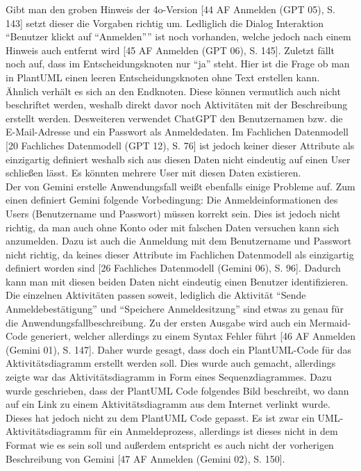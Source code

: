 Gibt man den groben Hinweis der 4o-Version [44 AF Anmelden (GPT 05), S. 143] setzt dieser die Vorgaben richtig um. Ledliglich die Dialog Interaktion ``Benutzer klickt auf ``Anmelden''''
ist noch vorhanden, welche jedoch nach einem Hinweis auch entfernt wird [45 AF Anmelden (GPT 06), S. 145]. Zuletzt fällt noch auf, dass
im Entscheidungsknoten nur ``ja'' steht. Hier ist die Frage ob man in PlantUML einen leeren Entscheidungsknoten ohne Text erstellen kann. Ähnlich 
verhält es sich an den Endknoten. Diese können vermutlich auch nicht beschriftet werden, weshalb direkt davor noch Aktivitäten mit der Beschreibung erstellt
werden. Desweiteren verwendet ChatGPT den Benutzernamen bzw. die E-Mail-Adresse und ein Passwort als Anmeldedaten. Im Fachlichen Datenmodell 
[20 Fachliches Datenmodell (GPT 12), S. 76] ist jedoch keiner dieser Attribute als einzigartig definiert weshalb sich aus diesen Daten nicht eindeutig 
auf einen User schließen lässt. Es könnten mehrere User mit diesen Daten existieren.\\

Der von Gemini erstelle Anwendungsfall weißt ebenfalls einige Probleme auf. Zum einen definiert Gemini folgende Vorbedingung: Die Anmeldeinformationen des 
Users (Benutzername und Passwort) müssen korrekt sein. Dies ist jedoch nicht richtig, da man auch ohne Konto oder mit falschen Daten versuchen kann sich 
anzumelden. Dazu ist auch die Anmeldung mit dem Benutzername und Passwort nicht richtig, da keines dieser Attribute im Fachlichen Datenmodell als einzigartig
definiert worden sind [26 Fachliches Datenmodell (Gemini 06), S. 96]. Dadurch kann man mit diesen beiden Daten nicht eindeutig einen Benutzer 
identifizieren. Die einzelnen Aktivitäten passen soweit, 
lediglich die Aktivität ``Sende Anmeldebestätigung'' und ``Speichere Anmeldesitzung'' sind etwas zu genau für die Anwendungsfallbeschreibung. Zu der ersten 
Ausgabe wird auch ein Mermaid-Code generiert, welcher allerdings zu einem Syntax Fehler führt [46 AF Anmelden (Gemini 01), S. 147]. 
Daher wurde gesagt, dass doch ein PlantUML-Code für das 
Aktivitätsdiagramm erstellt werden soll. Dies wurde auch gemacht, allerdings zeigte war das Aktivitätsdiagramm in Form eines Sequenzdiagrammes. Dazu wurde 
geschrieben, dass der PlantUML Code folgendes Bild beschreibt, wo dann auf ein Link zu einem Aktivitätsdiagramm aus dem Internet verlinkt wurde. Dieses hat 
jedoch nicht zu dem PlantUML Code gepasst. Es ist zwar ein UML-Aktivitätsdiagramm für ein Anmeldeprozess, allerdings ist dieses nicht in dem Format wie es 
sein soll und außerdem entspricht es auch nicht der vorherigen Beschreibung von Gemini [47 AF Anmelden (Gemini 02), S. 150].\\

